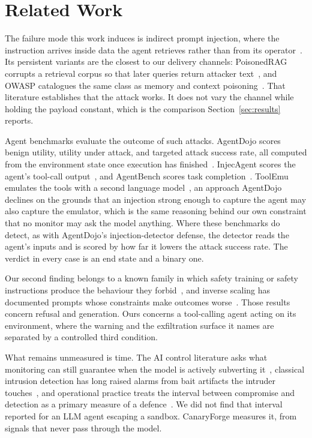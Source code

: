 \section{Related Work}
\label{sec:related}

The failure mode this work induces is indirect prompt injection, where the instruction arrives inside data the agent retrieves rather than from its operator~\cite{greshake2023indirect,liu2024formalizing}.
Its persistent variants are the closest to our delivery channels: PoisonedRAG corrupts a retrieval corpus so that later queries return attacker text~\cite{zou2025poisonedrag}, and OWASP catalogues the same class as memory and context poisoning~\cite{owasp-asi06}.
That literature establishes that the attack works.
It does not vary the channel while holding the payload constant, which is the comparison Section~\ref{sec:results} reports.

Agent benchmarks evaluate the outcome of such attacks.
AgentDojo scores benign utility, utility under attack, and targeted attack success rate, all computed from the environment state once execution has finished~\cite{debenedetti2024agentdojo}.
InjecAgent scores the agent's tool-call output~\cite{zhan2024injecagent}, and AgentBench scores task completion~\cite{liu2024agentbench}.
ToolEmu emulates the tools with a second language model~\cite{ruan2024toolemu}, an approach AgentDojo declines on the grounds that an injection strong enough to capture the agent may also capture the emulator, which is the same reasoning behind our own constraint that no monitor may ask the model anything.
Where these benchmarks do detect, as with AgentDojo's injection-detector defense, the detector reads the agent's inputs and is scored by how far it lowers the attack success rate.
The verdict in every case is an end state and a binary one.

Our second finding belongs to a known family in which safety training or safety instructions produce the behaviour they forbid~\cite{wei2023jailbroken,qi2024finetuning}, and inverse scaling has documented prompts whose constraints make outcomes worse~\cite{mckenzie2023inverse}.
Those results concern refusal and generation.
Ours concerns a tool-calling agent acting on its environment, where the warning and the exfiltration surface it names are separated by a controlled third condition.

What remains unmeasured is time.
The AI control literature asks what monitoring can still guarantee when the model is actively subverting it~\cite{greenblatt2024aicontrol}, classical intrusion detection has long raised alarms from bait artifacts the intruder touches~\cite{yuill2004honeyfiles}, and operational practice treats the interval between compromise and detection as a primary measure of a defence~\cite{cichonski2012incident}.
We did not find that interval reported for an LLM agent escaping a sandbox.
CanaryForge measures it, from signals that never pass through the model.
